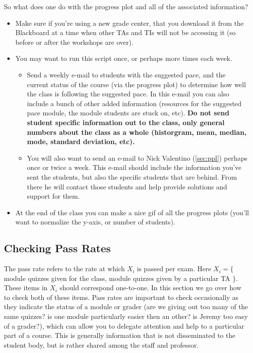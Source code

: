 \documentclass[12pt]{article}
\begin{document}
\noindent So what does one do with the progress plot and all of the associated information?

\begin{itemize}
	\item Make sure if you're using a new grade center, that you download it from the Blackboard at a time when other TAs and TIs will not be accessing it (so before or after the workshops are over).
	\item You may want to run this script once, or perhaps more times each week.
	\begin{itemize}
		\item Send a weekly e-mail to students with the suggested pace, and the current status of the course (via the progress plot) to determine how well the class is following the suggested pace. In this e-mail you can also include a bunch of other added information (resources for the suggested pace module, the module students are stuck on, etc). \textbf{Do not send student specific information out to the class, only general numbers about the class as a whole (historgram, mean, median, mode, standard deviation, etc).}
		\item You will also want to send an e-mail to Nick Valentino (\ref{sec:ppl}) perhaps once or twice a week. This e-mail should include the information you've sent the students, but also the specific students that are behind. From there he will contact those students and help provide solutions and support for them.
	\end{itemize}
	\item At the end of the class you can make a nice gif of all the progress plots (you'll want to normalize the y-axis, or number of students).
\end{itemize}

\subsection{Checking Pass Rates} \label{sec:cpr}

\noindent The pass rate refers to the rate at which $X_{i}$ is passed per exam. Here $X_{i} = \{$ module quizzes given for the class, module quizzes given by a particular TA $\}$. These items in $X_{i}$ should correspond one-to-one. In this section we go over how to check both of these items. Pass rates are important to check occasionally as they indicate the status of a module or grader (are we giving out too many of the same quizzes? is one module particularly easier then an other? is Jeremy too easy of a grader?), which can allow you to delegate attention and help to a particular part of a course. This is generally information that is not disseminated to the student body, but is rather shared among the staff and professor.
\end{document}
